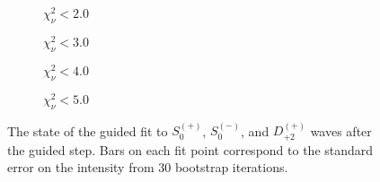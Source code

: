 \begin{figure}[htbp]
    \centering
    \begin{subfigure}{0.45\textwidth}
        
        \caption{$\chi^2_\nu < 2.0$}
    \end{subfigure}
    \hfill
    \begin{subfigure}{0.45\textwidth}
        
        \caption{$\chi^2_\nu < 3.0$}
    \end{subfigure}
    \vspace{1em}
    \begin{subfigure}{0.45\textwidth}
        
        \caption{$\chi^2_\nu < 4.0$}
    \end{subfigure}
    \hfill
    \begin{subfigure}{0.45\textwidth}
        
        \caption{$\chi^2_\nu < 5.0$}
    \end{subfigure}

    \caption{The state of the guided fit to $S_{0}^{(+)}$, $S_{0}^{(-)}$, and $D_{+2}^{(+)}$ waves after the guided step. Bars on each fit point correspond to the standard error on the intensity from $ 30 $ bootstrap iterations.}
    \label{fig:guided-fit-all-Spn-D2p}
\end{figure}

